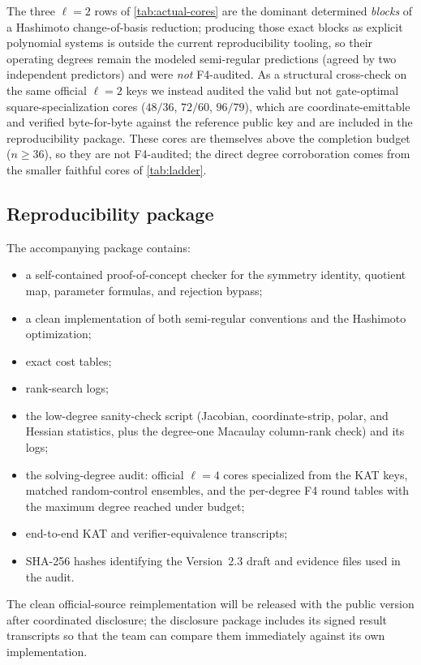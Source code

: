 \documentclass[runningheads]{llncs}
\begin{document}
The three $\ell=2$ rows of \cref{tab:actual-cores} are the dominant determined
\emph{blocks} of a Hashimoto change-of-basis reduction; producing those exact
blocks as explicit polynomial systems is outside the current reproducibility
tooling, so their operating degrees remain the modeled semi-regular predictions
(agreed by two independent predictors) and were \emph{not} F4-audited.  As a
structural cross-check on the same official $\ell=2$ keys we instead audited the
valid but not gate-optimal square-specialization cores ($48/36$, $72/60$,
$96/79$), which are coordinate-emittable and verified byte-for-byte against the
reference public key and are included in the reproducibility package.  These
cores are themselves above the completion budget ($n\ge36$), so they are not
F4-audited; the direct degree corroboration comes from the smaller faithful cores
of \cref{tab:ladder}.

\subsection{Reproducibility package}

The accompanying package contains:
\begin{itemize}
\item a self-contained proof-of-concept checker for the symmetry identity, quotient map, parameter formulas, and rejection bypass;
\item a clean implementation of both semi-regular conventions and the Hashimoto optimization;
\item exact cost tables;
\item rank-search logs;
\item the low-degree sanity-check script (Jacobian, coordinate-strip, polar, and
Hessian statistics, plus the degree-one Macaulay column-rank check) and its
logs;
\item the solving-degree audit: official $\ell=4$ cores specialized from the KAT
keys, matched random-control ensembles, and the per-degree F4 round tables with
the maximum degree reached under budget;
\item end-to-end KAT and verifier-equivalence transcripts;
\item SHA-256 hashes identifying the Version~2.3 draft and evidence files used in the audit.
\end{itemize}
The clean official-source reimplementation will be released with the public version after coordinated disclosure; the disclosure package includes its signed result transcripts so that the team can compare them immediately against its own implementation.
\end{document}
